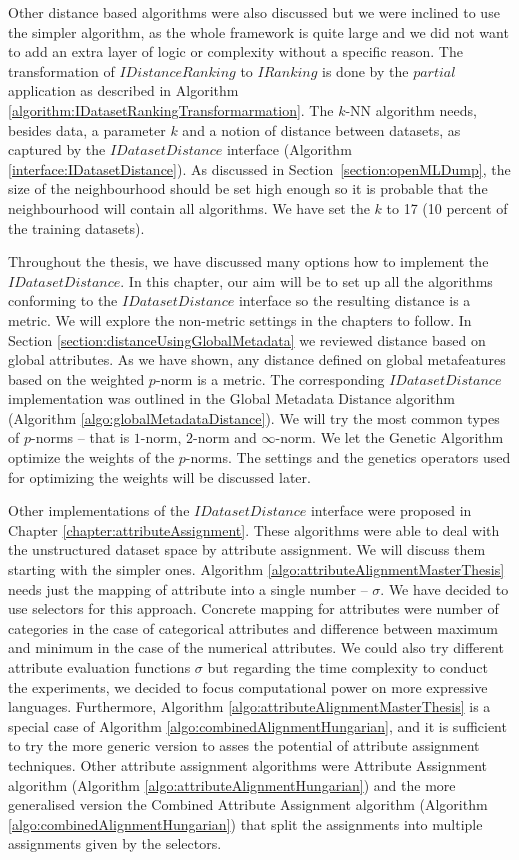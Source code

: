  Other distance based algorithms were also discussed but we were inclined to use the simpler algorithm, as the whole framework is quite large and we did not want to add an extra layer of logic or complexity without a specific reason. The transformation of $IDistanceRanking$ to $IRanking$ is done by the $partial$ application as described in Algorithm \ref{algorithm:IDatasetRankingTransformarmation}. The $k$-NN algorithm needs, besides data, a parameter $k$ and a notion of distance between datasets, as captured by the $IDatasetDistance$ interface (Algorithm \ref{interface:IDatasetDistance}). As discussed in Section~\ref{section:openMLDump}, the size of the neighbourhood should be set high enough so it is probable that the neighbourhood will contain all algorithms. We have set the $k$ to 17 (10 percent of the training datasets).

Throughout the thesis, we have discussed many options how to implement the $IDatasetDistance$. In this chapter, our aim will be to set up all the algorithms conforming to the $IDatasetDistance$ interface so the resulting distance is a metric. We will explore the non-metric settings in the chapters to follow. In Section \ref{section:distanceUsingGlobalMetadata} we reviewed distance based on global attributes. As we have shown, any distance defined on global metafeatures based on the weighted $p$-norm is a metric. The corresponding $IDatasetDistance$ implementation was outlined in the Global Metadata Distance algorithm (Algorithm \ref{algo:globalMetadataDistance}). We will try the most common types of $p$-norms -- that is $1$-norm, $2$-norm and $\infty$-norm. We let the Genetic Algorithm optimize the weights of the $p$-norms. The settings and the genetics operators used for optimizing the weights will be discussed later. 

Other implementations of the $IDatasetDistance$ interface were proposed in Chapter \ref{chapter:attributeAssignment}. These algorithms were able to deal with the unstructured dataset space by attribute assignment. We will discuss them starting with the simpler ones. Algorithm \ref{algo:attributeAlignmentMasterThesis} needs just the mapping of attribute into a single number -- $\sigma$. We have decided to use selectors for this approach. Concrete mapping for attributes were number of categories in the case of categorical attributes and difference between maximum and minimum in the case of the numerical attributes. We could also try different attribute evaluation functions $\sigma$ but regarding the time complexity to conduct the experiments, we decided to focus computational power on more expressive languages. Furthermore, Algorithm \ref{algo:attributeAlignmentMasterThesis} is a special case of Algorithm \ref{algo:combinedAlignmentHungarian}, and it is sufficient to try the more generic version to asses the potential of attribute assignment techniques. Other attribute assignment algorithms were Attribute Assignment algorithm (Algorithm \ref{algo:attributeAlignmentHungarian}) and the more generalised version the Combined Attribute Assignment algorithm (Algorithm \ref{algo:combinedAlignmentHungarian}) that split the assignments into multiple assignments given by the selectors. 

